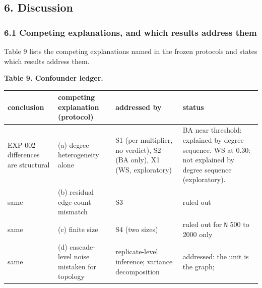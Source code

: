 \documentclass[
]{article}
\begin{document}
\subsection{6. Discussion}\label{discussion}

\subsubsection{6.1 Competing explanations, and which results address
them}\label{competing-explanations-and-which-results-address-them}

Table 9 lists the competing explanations named in the frozen protocols
and states which results address them.

\textbf{Table 9. Confounder ledger.}

\begin{longtable}[]{@{}
  >{\raggedright\arraybackslash}p{}
  >{\raggedright\arraybackslash}p{}
  >{\raggedright\arraybackslash}p{}
  >{\raggedright\arraybackslash}p{}@{}}
\toprule\noalign{}
\begin{minipage}[b]{\linewidth}\raggedright
conclusion
\end{minipage} & \begin{minipage}[b]{\linewidth}\raggedright
competing explanation (protocol)
\end{minipage} & \begin{minipage}[b]{\linewidth}\raggedright
addressed by
\end{minipage} & \begin{minipage}[b]{\linewidth}\raggedright
status
\end{minipage} \\
\midrule\noalign{}
\endhead
\bottomrule\noalign{}
\endlastfoot
EXP-002 differences are structural & (a) degree heterogeneity alone & S1
(per multiplier, no verdict), S2 (BA only), X1 (WS, exploratory) & BA
near threshold: explained by degree sequence. WS at 0.30: not explained
by degree sequence (exploratory). \\
same & (b) residual edge-count mismatch & S3 & ruled out \\
same & (c) finite size & S4 (two sizes) & ruled out for \texttt{N} 500
to 2000 only \\
same & (d) cascade-level noise mistaken for topology & replicate-level
inference; variance decomposition & addressed: the unit is the graph;

\end{longtable}
\end{document}
